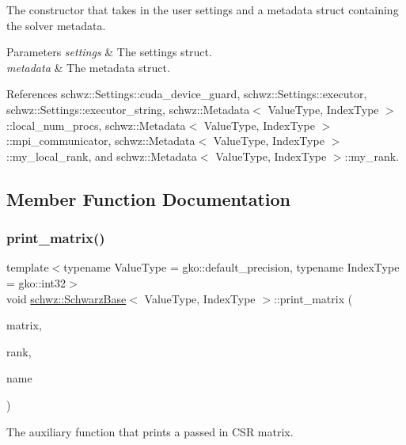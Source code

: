 The constructor that takes in the user settings and a metadata struct containing the solver metadata. 


\begin{DoxyParams}{Parameters}
{\em settings} & The settings struct. \\
\hline
{\em metadata} & The metadata struct. \\
\hline
\end{DoxyParams}


References schwz\+::\+Settings\+::cuda\+\_\+device\+\_\+guard, schwz\+::\+Settings\+::executor, schwz\+::\+Settings\+::executor\+\_\+string, schwz\+::\+Metadata$<$ Value\+Type, Index\+Type $>$\+::local\+\_\+num\+\_\+procs, schwz\+::\+Metadata$<$ Value\+Type, Index\+Type $>$\+::mpi\+\_\+communicator, schwz\+::\+Metadata$<$ Value\+Type, Index\+Type $>$\+::my\+\_\+local\+\_\+rank, and schwz\+::\+Metadata$<$ Value\+Type, Index\+Type $>$\+::my\+\_\+rank.



\subsection{Member Function Documentation}
\mbox{\label{classschwz_1_1SchwarzBase_ae671d00ba78877589cb082724c469ff6}} 
\subsubsection{\texorpdfstring{print\+\_\+matrix()}{print\_matrix()}}
{\footnotesize\ttfamily template$<$typename Value\+Type  = gko\+::default\+\_\+precision, typename Index\+Type  = gko\+::int32$>$ \\
void \hyperlink{classschwz_1_1SchwarzBase}{schwz\+::\+Schwarz\+Base}$<$ Value\+Type, Index\+Type $>$\+::print\+\_\+matrix (\begin{DoxyParamCaption}\item[{const std\+::shared\+\_\+ptr$<$ gko\+::matrix\+::\+Csr$<$ Value\+Type, Index\+Type $>$$>$ \&}]{matrix,  }\item[{int}]{rank,  }\item[{std\+::string}]{name }\end{DoxyParamCaption})}



The auxiliary function that prints a passed in C\+SR matrix. 


